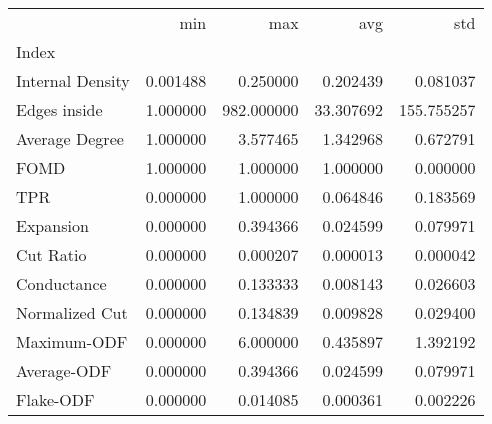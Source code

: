 \begin{tabular}{lrrrr}
\toprule
{} &       min &         max &        avg &         std \\
Index            &           &             &            &             \\
\midrule
Internal Density &  0.001488 &    0.250000 &   0.202439 &    0.081037 \\
Edges inside     &  1.000000 &  982.000000 &  33.307692 &  155.755257 \\
Average Degree   &  1.000000 &    3.577465 &   1.342968 &    0.672791 \\
FOMD             &  1.000000 &    1.000000 &   1.000000 &    0.000000 \\
TPR              &  0.000000 &    1.000000 &   0.064846 &    0.183569 \\
Expansion        &  0.000000 &    0.394366 &   0.024599 &    0.079971 \\
Cut Ratio        &  0.000000 &    0.000207 &   0.000013 &    0.000042 \\
Conductance      &  0.000000 &    0.133333 &   0.008143 &    0.026603 \\
Normalized Cut   &  0.000000 &    0.134839 &   0.009828 &    0.029400 \\
Maximum-ODF      &  0.000000 &    6.000000 &   0.435897 &    1.392192 \\
Average-ODF      &  0.000000 &    0.394366 &   0.024599 &    0.079971 \\
Flake-ODF        &  0.000000 &    0.014085 &   0.000361 &    0.002226 \\
\bottomrule
\end{tabular}
